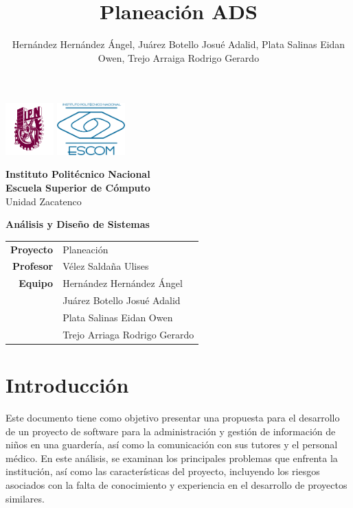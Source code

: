 \documentclass{article}
\author{Hernández Hernández Ángel, Juárez Botello Josué Adalid, Plata Salinas Eidan Owen, Trejo Arraiga Rodrigo Gerardo}
\title{Planeación ADS}
\begin{document}
\begin{titlepage}
	\centering
	\includegraphics[height=2cm]{Logo_IPN.png}
	\hfill
	\includegraphics[height=2cm]{escudoESCOM.png}

	\vspace{-1.5cm}
	\large\textbf{ Instituto Politécnico Nacional}\\
	\large\textbf{Escuela Superior de Cómputo}\\
	\large{Unidad Zacatenco}

	\vspace{2cm}

	\Large{\textbf{Análisis y Diseño de Sistemas}}

	\vspace{10cm}

	\begin{tabular}{rl}
		\textbf{Proyecto} & Planeación                    \\
		\textbf{Profesor} & Vélez Saldaña Ulises          \\
		\textbf{Equipo}
		                  & Hernández Hernández Ángel     \\
		                  & Juárez Botello Josué Adalid   \\
		                  & Plata Salinas Eidan Owen      \\
		                  & Trejo Arriaga Rodrigo Gerardo \\
	\end{tabular}
\end{titlepage}

\tableofcontents
\pagebreak

\section{Introducción}

Este documento tiene como objetivo presentar una propuesta para el desarrollo de un proyecto de software para la administración y gestión de información de niños en una guardería, así como la comunicación con sus tutores y el personal médico. En este análisis, se examinan los principales problemas que enfrenta la institución, así como las características del proyecto, incluyendo los riesgos asociados con la falta de conocimiento y experiencia en el desarrollo de proyectos similares.
\end{document}
